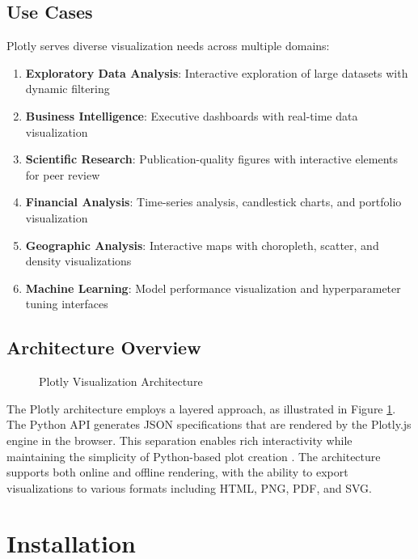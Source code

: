 \subsection{Use Cases}
\label{subsec:usecases}

Plotly serves diverse visualization needs across multiple domains:

\begin{enumerate}
	\item \textbf{Exploratory Data Analysis}: Interactive exploration of large datasets with dynamic filtering
	\item \textbf{Business Intelligence}: Executive dashboards with real-time data visualization
	\item \textbf{Scientific Research}: Publication-quality figures with interactive elements for peer review
	\item \textbf{Financial Analysis}: Time-series analysis, candlestick charts, and portfolio visualization
	\item \textbf{Geographic Analysis}: Interactive maps with choropleth, scatter, and density visualizations
	\item \textbf{Machine Learning}: Model performance visualization and hyperparameter tuning interfaces
\end{enumerate}

\subsection{Architecture Overview}
\label{subsec:architecture}

\begin{figure}[H]
	\centering
	
	\caption{Plotly Visualization Architecture \cite{Plotly:2024}}
	\label{fig:plotly_architecture}
\end{figure}

The Plotly architecture employs a layered approach, as illustrated in Figure \ref{fig:plotly_architecture}. The Python API generates JSON specifications that are rendered by the Plotly.js engine in the browser. This separation enables rich interactivity while maintaining the simplicity of Python-based plot creation \cite{Plotly:2024}. The architecture supports both online and offline rendering, with the ability to export visualizations to various formats including HTML, PNG, PDF, and SVG.



\section{Installation}
\label{sec:installation}

